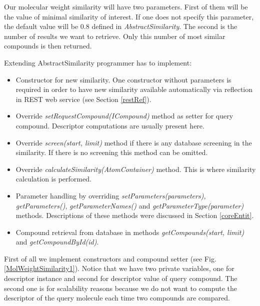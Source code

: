 \documentclass[thesis=M,english]{FITthesis}[2012/10/20]
\begin{document}
Our molecular weight similarity will have two parameters. First of them will be the value of minimal similarity of interest. If one does not specify this parameter, the default value will be 0.8 defined in \textit{AbstractSimilarity}. The second is the number of results we want to retrieve. Only this number of most similar compounds is then returned.

Extending AbstractSimilarity programmer has to implement:
\begin{itemize}
\item Constructor for new similarity. One constructor without parameters is required in order to have new similarity available automatically via reflection in REST web service (see Section \ref{restRef}). 
\item Override \textit{setRequestCompound(ICompound)} method as setter for query compound. Descriptor computations are usually present here.
\item Override \textit{screen(start, limit)} method if there is any database screening in the similarity. If there is no screening this method can be omitted.
\item Override \textit{calculateSimilarity(AtomContainer)} method. This is where similarity calculation is performed.
\item Parameter handling by overriding \textit{setParameters(parameters)}, \textit{getParameters()}, \textit{getParameterNames()} and \textit{getParameterType(parameter)} methods. Descriptions of these methods were discussed in Section \ref{coreEntit}.
\item Compound retrieval from database in methods \textit{getCompounds(start, limit)} and   \textit{getCompoundById(id)}.
\end{itemize}

First of all we implement constructors and compound setter (see Fig. \ref{MolWeightSimilarity1}). Notice that we have two private variables, one for descriptor instance and second for descriptor value of query compound. The second one is for scalability reasons because we do not want to compute the descriptor of the query molecule each time two compounds are compared. 
\end{document}
